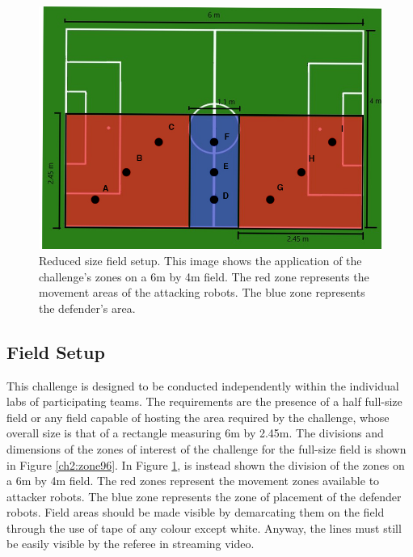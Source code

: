 \begin{figure}[ht]
\includegraphics[width=0.95\linewidth]{figs/ch_2_reduced.jpg}
\caption{Reduced size field setup. This image shows the application of the challenge's zones on a 6m by 4m field. The red zone represents the movement areas of the attacking robots. The blue zone represents the defender's area.}
\label{ch2:zone64}
\centering
\end{figure}


\subsection{Field Setup}
This challenge is designed to be conducted independently within the individual labs of participating teams. The requirements are the presence of a half full-size field or any field capable of hosting the area required by the challenge, whose overall size is that of a rectangle measuring 6m by 2.45m.  
The divisions and dimensions of the zones of interest of the challenge for the full-size field is shown in Figure \ref{ch2:zone96}. In Figure \ref{ch2:zone64}, is instead shown the division of the zones on a 6m by 4m field.
The red zones represent the movement zones available to attacker robots. The blue zone represents the zone of placement of the defender robots.
Field areas should be made visible by demarcating them on the field through the use of tape of any colour except white. Anyway, the lines must still be easily visible by the referee in streaming video.



